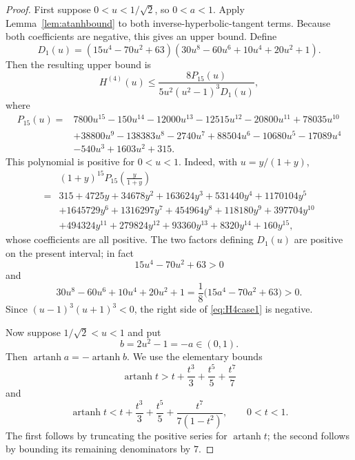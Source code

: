 \documentclass[11pt]{article}
\theoremstyle{definition}
\theoremstyle{remark}
\newcommand{\artanh}{\operatorname{artanh}}
\begin{document}
\begin{proof}
First suppose $0<u<1/\sqrt2$, so $0<a<1$.  Apply Lemma~\ref{lem:atanhbound} to both inverse-hyperbolic-tangent terms.  Because both coefficients are negative, this gives an upper bound.
Define
\[
D_1(u)=(15u^4-70u^2+63)
(30u^8-60u^6+10u^4+20u^2+1).
\]
Then the resulting upper bound is
\begin{equation}
\label{eq:H4case1}
H^{(4)}(u)
\le
\frac{8P_{15}(u)}{5u^2(u^2-1)^3D_1(u)},
\end{equation}
where
\begin{align*}
P_{15}(u)={}&
7800u^{15}-150u^{14}-12000u^{13}-12515u^{12}
-20800u^{11}+78035u^{10}\\
&+38800u^9-138383u^8-2740u^7+88504u^6
-10680u^5-17089u^4\\
&-540u^3+1603u^2+315.
\end{align*}
This polynomial is positive for $0<u<1$.  Indeed, with $u=y/(1+y)$,
\begin{align*}
&(1+y)^{15}P_{15}\left(\frac{y}{1+y}\right)\\
={}&315+4725y+34678y^2+163624y^3+531440y^4
+1170104y^5\\
&+1645729y^6+1316297y^7+454964y^8+118180y^9
+397704y^{10}\\
&+494324y^{11}+279824y^{12}+93360y^{13}+8320y^{14}+160y^{15},
\end{align*}
whose coefficients are all positive.  The two factors defining $D_1(u)$ are positive on the present interval; in fact
\[
15u^4-70u^2+63>0
\]
and
\[
30u^8-60u^6+10u^4+20u^2+1
=\frac18\bigl(15a^4-70a^2+63\bigr)>0.
\]
Since $(u-1)^3(u+1)^3<0$, the right side of \eqref{eq:H4case1} is negative.

Now suppose $1/\sqrt2<u<1$ and put
\[
b=2u^2-1=-a\in(0,1).
\]
Then $\artanh a=-\artanh b$.  We use the elementary bounds
\begin{equation}
\label{eq:atanhlowertrunc}
\artanh t>
 t+\frac{t^3}{3}+\frac{t^5}{5}+\frac{t^7}{7}
\end{equation}
and
\begin{equation}
\label{eq:atanhuppertrunc}
\artanh t<
 t+\frac{t^3}{3}+\frac{t^5}{5}
 +\frac{t^7}{7(1-t^2)},
\qquad 0<t<1.
\end{equation}
The first follows by truncating the positive series for $\artanh t$; the second follows by bounding its remaining denominators by $7$.


\end{proof}
\end{document}
